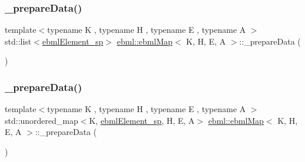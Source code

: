 \mbox{\label{classebml_1_1ebmlMap_ad061162f3c9e15b0b93af5e557beca6e}} 
\subsubsection{\texorpdfstring{\+\_\+prepare\+Data()}{\_prepareData()}\hspace{0.1cm}{\footnotesize\ttfamily [4/6]}}
{\footnotesize\ttfamily template$<$typename K , typename H , typename E , typename A $>$ \\
std\+::list$<$\mbox{\hyperlink{namespaceebml_adad533b7705a16bb360fe56380c5e7be}{ebml\+Element\+\_\+sp}}$>$ \mbox{\hyperlink{classebml_1_1ebmlMap}{ebml\+::ebml\+Map}}$<$ K, H, E, A $>$\+::\+\_\+prepare\+Data (\begin{DoxyParamCaption}\item[{std\+::list$<$ std\+::pair$<$ K, \mbox{\hyperlink{namespaceebml_adad533b7705a16bb360fe56380c5e7be}{ebml\+Element\+\_\+sp}} $>$$>$ \&\&}]{ }\end{DoxyParamCaption})\hspace{0.3cm}{\ttfamily [protected]}}

\mbox{\label{classebml_1_1ebmlMap_a5321d1ef4be520aaee8cf6428686314b}} 
\subsubsection{\texorpdfstring{\+\_\+prepare\+Data()}{\_prepareData()}\hspace{0.1cm}{\footnotesize\ttfamily [5/6]}}
{\footnotesize\ttfamily template$<$typename K , typename H , typename E , typename A $>$ \\
std\+::unordered\+\_\+map$<$K, \mbox{\hyperlink{namespaceebml_adad533b7705a16bb360fe56380c5e7be}{ebml\+Element\+\_\+sp}}, H, E, A$>$ \mbox{\hyperlink{classebml_1_1ebmlMap}{ebml\+::ebml\+Map}}$<$ K, H, E, A $>$\+::\+\_\+prepare\+Data (\begin{DoxyParamCaption}\item[{const std\+::unordered\+\_\+map$<$ K, \mbox{\hyperlink{namespaceebml_adad533b7705a16bb360fe56380c5e7be}{ebml\+Element\+\_\+sp}}, H, E, A $>$ \&}]{ }\end{DoxyParamCaption})\hspace{0.3cm}{\ttfamily [protected]}}

